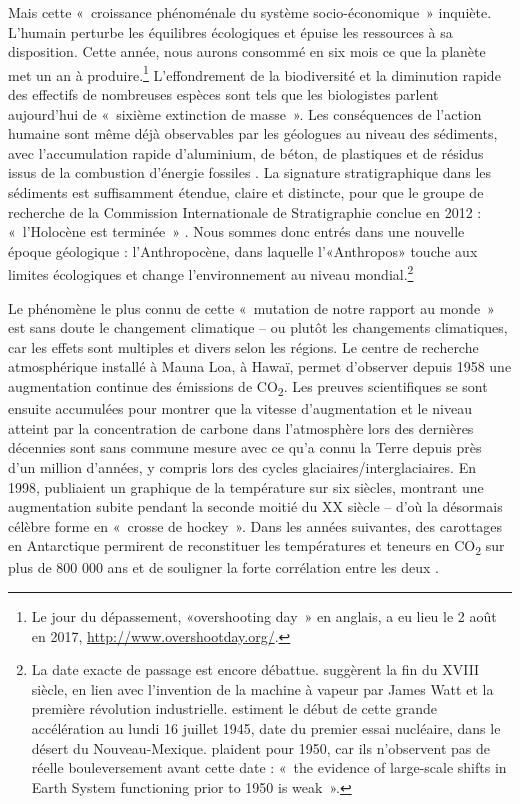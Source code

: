 Mais cette «~croissance phénoménale du système socio-économique~» \citep{Steffen2004} inquiète. L’humain perturbe les équilibres écologiques et épuise les ressources à sa disposition. Cette année, nous aurons consommé en six mois ce que la planète met un an à produire.\footnote{Le jour du dépassement, «overshooting day~» en anglais, a eu lieu le 2 août en 2017, \url{http://www.overshootday.org/}.} L’effondrement de la biodiversité et la diminution rapide des effectifs de nombreuses espèces sont tels que les biologistes parlent aujourd’hui de «~sixième extinction de masse~». Les conséquences de l'action humaine sont même déjà observables par les géologues au niveau des sédiments, avec l'accumulation rapide d'aluminium, de béton, de plastiques et de résidus issus de la combustion d'énergie fossiles \citep{Waters2016}. La signature stratigraphique dans les sédiments est suffisamment étendue, claire et distincte, pour que le groupe de recherche de la Commission Internationale de Stratigraphie conclue en 2012 : «~l'Holocène est terminée~» \citep{Latour2014}. Nous sommes donc entrés dans une nouvelle époque géologique : l'Anthropocène, dans laquelle l'«Anthropos» touche aux limites écologiques et change l'environnement au niveau mondial.\footnote{La date exacte de passage est encore débattue. \citet{Crutzen2000} suggèrent la fin du XVIII siècle, en lien avec l'invention de la machine à vapeur par James Watt et la première révolution industrielle. \citet{Zalasiewicz2014} estiment le début de cette grande accélération au lundi 16 juillet 1945, date du premier essai nucléaire, dans le désert du Nouveau-Mexique. \citet{Steffen2015} plaident pour 1950, car ils n'observent pas de réelle bouleversement avant cette date : «~the evidence of large-scale shifts in Earth System functioning prior to 1950 is weak~».}

Le phénomène le plus connu de cette «~mutation de notre rapport au monde~» \citep{Latour2015} est sans doute le changement climatique -- ou plutôt les changements climatiques, car les effets sont multiples et divers selon les régions.
Le centre de recherche atmosphérique installé à Mauna Loa, à Hawaï, permet d'observer depuis 1958 une augmentation continue des émissions de CO\textsubscript{2}. Les preuves scientifiques se sont ensuite accumulées pour montrer que la vitesse d'augmentation et le niveau atteint par la concentration de carbone dans l'atmosphère lors des dernières décennies sont sans commune mesure avec ce qu'a connu la Terre depuis près d'un million d'années, y compris lors des cycles glaciaires/interglaciaires. En 1998, \citet{Mann1998} publiaient un graphique de la température sur six siècles, montrant une augmentation subite pendant la seconde moitié du XX siècle -- d'où la désormais célèbre forme en «~crosse de hockey~». 
Dans les années suivantes, des carottages en Antarctique permirent de reconstituer les températures et teneurs en CO\textsubscript{2} sur plus de 800 000 ans et de souligner la forte corrélation entre les deux \citep{Petit1999,Luthi2008}.

